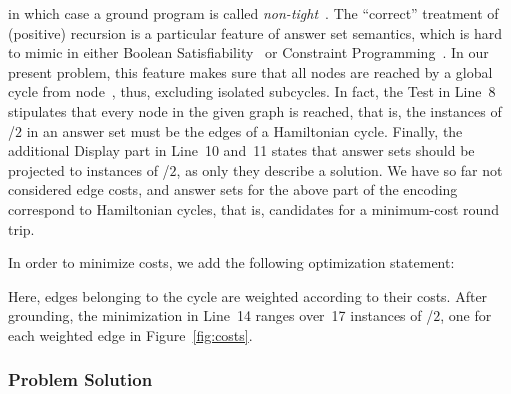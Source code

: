 in which case a ground program is called \emph{non-tight}~\cite{erdlif03a,fages94a}.
The ``correct'' treatment of (positive) recursion 
is a particular feature of answer set semantics,
which is hard to mimic in either
Boolean Satisfiability~\cite{SATHandbook} or
Constraint Programming~\cite{CPHandbook}.
In our present problem, this feature makes sure that all nodes are reached
by a global cycle from node~, thus, excluding isolated subcycles.
In fact, the Test in Line~8 stipulates that every node in the given graph
is reached, that is, the instances of /$2$ in an answer set
must be the edges of a Hamiltonian cycle.%
%
Finally, the additional Display part in Line~10 and~11 states that answer
sets should be projected to instances of /$2$, as only they
describe a solution.
We have so far not considered edge costs,
and answer sets for the above 
part of the encoding correspond to Hamiltonian cycles,
that is, candidates for a minimum-cost round trip.

In order to minimize costs,
we add the following optimization statement:
%

%
Here, edges belonging to the cycle are weighted according to their costs.
After grounding, the minimization in Line~14 ranges over~17 instances
of /$2$, one for each weighted edge in Figure~\ref{fig:costs}.

\subsubsection{Problem Solution}\label{subsec:tsp:solution}


